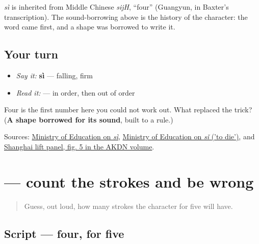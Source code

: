 \begin{cousinweb}
\textbf{} \emph{sì} is inherited from Middle Chinese \emph{sijH}, \textquotedblleft{}four\textquotedblright{} (Guangyun, in Baxter's transcription). The sound-borrowing above is the history of the character: the word came first, and a shape was borrowed to write it.
\end{cousinweb}

\subsection*{Your turn}
\begin{itemize}
\raggedright
  \item \emph{Say it:} \textbf{sì} — falling, firm
  \item \emph{Read it:}     — in order, then out of order
\end{itemize}

\begin{tcolorbox}[breakable,colback=teal!4,colframe=teal!35!black,title={Before you move on}]
Four is the first number here you could not work out. What replaced the trick? (\textbf{A shape borrowed for its sound}, built to a rule.)

Sources: \href{https://dict.revised.moe.edu.tw/dictView.jsp?ID=9978\&la=0\&powerMode=0}{Ministry of Education on  \emph{sì}}, \href{https://dict.revised.moe.edu.tw/dictView.jsp?ID=9974\&la=0\&powerMode=0}{Ministry of Education on \emph{sǐ} ('to die')}, and \href{https://static.the.akdn/53832/1650573508-2016\_akaa\_shaping\_cities.pdf}{Shanghai lift panel, fig. 5 in the AKDN volume}.
\end{tcolorbox}
\section[\texorpdfstring{\zh{五} (wǔ)}{五 (wǔ)}]{ — count the strokes and be wrong}

\label{lesson:ZH-W03-wu}



\begin{quote}
Guess, out loud, how many strokes the character for five will have.
\end{quote}

\subsection*{Script — four, for five}

